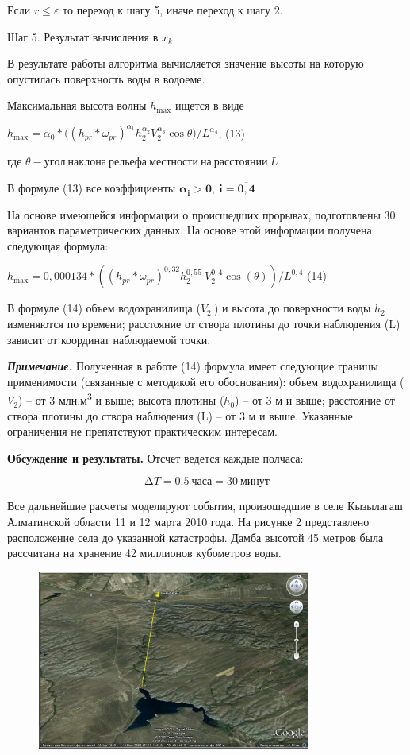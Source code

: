 {Если \(r \leq \varepsilon\) то переход к шагу 5, иначе переход к шагу 2.

Шаг 5. Результат вычисления в \(x_{k}\)

В результате работы алгоритма вычисляется значение высоты на которую
опустилась поверхность воды в водоеме.

Максимальная высота волны \(h_{\max}\) ищется в виде

\(h_{\max} = \alpha_{0}*(\left( h_{pr}*\omega_{pr} \right)^{\alpha_{1}}h_{2}^{\alpha_{2}}V_{2}^{\alpha_{3}}\cos{\theta)/L^{\alpha_{4}}}\),
(13)

где \(\theta - угол\ наклона\ рельефа\ местности\ на\ расстоянии\ L\)

В формуле (13) все коэффициенты
\(\mathbf{\alpha}_{\mathbf{i}}\mathbf{>}\mathbf{0,\ }\mathbf{i}\mathbf{=}\overline{\mathbf{0,4}}\)

На основе имеющейся информации о происшедших прорывах, подготовлены 30
вариантов параметрических данных. На основе этой информации получена
следующая формула:

\(h_{\max} = 0,000134*(\left( h_{pr}*\omega_{pr} \right)^{0,32}h_{2}^{0,55}\ V_{2}^{0,4}\cos(\theta))/L^{0,4}\)
(14)

В формуле (14) объем водохранилища (\(V_{2}\ \)) и высота до поверхности
воды \(h_{2}\) изменяются по времени; расстояние от створа плотины до
точки наблюдения (L) зависит от координат наблюдаемой точки.

\emph{{\bfseries Примечание.}} Полученная в работе (14) формула имеет
следующие границы применимости (связанные с методикой его обоснования):
объем водохранилища (\(V_{2}\)) -- от 3 млн.м\textsuperscript{3} и выше;
высота плотины (\(h_{0}\)) -- от 3 м и выше; расстояние от створа
плотины до створа наблюдения (L) -- от 3 м и выше. Указанные ограничения
не препятствуют практическим интересам.

{\bfseries Обсуждение и результаты.} Отсчет ведется каждые полчаса:

\[\mathrm{\Delta}T = 0.5\ часа = 30\ минут\]

Все дальнейшие расчеты моделируют события, произошедшие в селе Кызылагаш
Алматинской области 11 и 12 марта 2010 года. На рисунке 2 представлено
расположение села до указанной катастрофы. Дамба высотой 45 метров была
рассчитана на хранение 42 миллионов кубометров воды.

\begin{figure}[H]
	\centering
	\includegraphics[width=0.8\textwidth]{media/ict/image3}
	\caption*{}
\end{figure}


}
